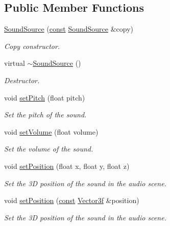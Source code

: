 \subsection*{Public Member Functions}
\begin{DoxyCompactItemize}
\item 
\hyperlink{classsf_1_1_sound_source_ae0c7728c1449fdebe65749ab6fcb3170}{Sound\-Source} (\hyperlink{term__entry_8h_a57bd63ce7f9a353488880e3de6692d5a}{const} \hyperlink{classsf_1_1_sound_source}{Sound\-Source} \&copy)
\begin{DoxyCompactList}\small\item\em Copy constructor. \end{DoxyCompactList}\item 
virtual \hyperlink{classsf_1_1_sound_source_a77c7c1524f8cb81df2de9375b0f87c5c}{$\sim$\-Sound\-Source} ()
\begin{DoxyCompactList}\small\item\em Destructor. \end{DoxyCompactList}\item 
void \hyperlink{classsf_1_1_sound_source_a72a13695ed48b7f7b55e7cd4431f4bb6}{set\-Pitch} (float pitch)
\begin{DoxyCompactList}\small\item\em Set the pitch of the sound. \end{DoxyCompactList}\item 
void \hyperlink{classsf_1_1_sound_source_a2f192f2b49fb8e2b82f3498d3663fcc2}{set\-Volume} (float volume)
\begin{DoxyCompactList}\small\item\em Set the volume of the sound. \end{DoxyCompactList}\item 
void \hyperlink{classsf_1_1_sound_source_a0480257ea25d986eba6cc3c1a6f8d7c2}{set\-Position} (float x, float y, float z)
\begin{DoxyCompactList}\small\item\em Set the 3\-D position of the sound in the audio scene. \end{DoxyCompactList}\item 
void \hyperlink{classsf_1_1_sound_source_a17ba9ed01925395652181a7b2a7d3aef}{set\-Position} (\hyperlink{term__entry_8h_a57bd63ce7f9a353488880e3de6692d5a}{const} \hyperlink{namespacesf_a36e44d9e6d8f649703698ec9d24ac052}{Vector3f} \&position)
\begin{DoxyCompactList}\small\item\em Set the 3\-D position of the sound in the audio scene. \end{DoxyCompactList}\item 

\end{DoxyCompactItemize}
